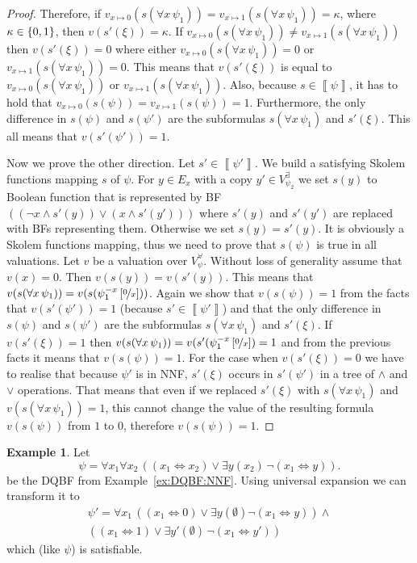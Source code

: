 \documentclass[
  digital, %
  color,
  twoside, %
  table,   %
  nolof,     %
  nolot,     %
]{fithesis3}
\let\setbuilder\set
\newcommand{\simpleset}[1]{\{{#1}\}}
\renewcommand{\set}[1]{\normalexpandarg\IfSubStr{#1}{|}{\setbuilder{#1}}{\simpleset{#1}}}
\theoremstyle{definition}
\newtheorem{example}{Example}
\theoremstyle{remark}
\newcommand{\seman}[1]{\left\llbracket {#1} \right\rrbracket}
\newcommand{\substitute}[2]{\left[ \nicefrac{#2}{#1} \right]}
\newcommand{\evars}[1]{V_{#1}^{\exists}}
\newcommand{\uvars}[1]{V_{#1}^{\forall}}
\newcommand{\lequal}{\Leftrightarrow}
\newcommand{\itholds}{\,}
\begin{document}
\begin{proof}
  Therefore, if $v_{x\mapsto0}(s(\forall x\itholds\psi_1)) = v_{x\mapsto1}(s(\forall x\itholds\psi_1)) = \kappa$, where $\kappa \in \set{0,1}$, then $v(s'(\xi)) = \kappa$. If $v_{x\mapsto0}(s(\forall x\itholds\psi_1)) \not= v_{x\mapsto1}(s(\forall x\itholds\psi_1))$ then $v(s'(\xi)) = 0$ where either $v_{x\mapsto0}(s(\forall x\itholds\psi_1)) = 0$ or $v_{x\mapsto1}(s(\forall x\itholds\psi_1)) = 0$. This means that $v(s'(\xi))$ is equal to $v_{x\mapsto0}(s(\forall x\itholds\psi_1))$ or $v_{x\mapsto1}(s(\forall x\itholds\psi_1))$. Also, because $s \in \seman{\psi}$, it has to hold that $v_{x\mapsto0}(s(\psi)) = v_{x\mapsto1}(s(\psi)) = 1$. Furthermore, the only difference in $s(\psi)$ and $s(\psi')$ are the subformulas $s(\forall x\itholds\psi_1)$ and $s'(\xi)$. This all means that $v(s'(\psi')) = 1$.

  Now we prove the other direction. Let $s' \in \seman{\psi'}$. We build a satisfying Skolem functions mapping $s$ of $\psi$. For $y \in E_x$ with a copy $y' \in \evars{\psi_2}$ we set $s(y)$ to Boolean function that is represented by BF $((\neg x \land s'(y)) \lor (x \land s'(y')))$ where $s'(y)$ and $s'(y')$ are replaced with BFs representing them. Otherwise we set $s(y) = s'(y)$. It is obviously a Skolem functions mapping, thus we need to prove that $s(\psi)$ is true in all valuations. Let $v$ be a valuation over $\uvars{\psi}$. Without loss of generality assume that $v(x) = 0$. Then $v(s(y)) = v(s'(y))$. This means that $v(s(\forall x \itholds \psi_1)) = v(s(\psi_1^{-x}\substitute{x}{0}))$. Again we show that $v(s(\psi)) = 1$ from the facts that $v(s'(\psi')) = 1$ (because $s' \in \seman{\psi'}$) and that the only difference in $s(\psi)$ and $s(\psi')$ are the subformulas $s(\forall x\itholds\psi_1)$ and $s'(\xi)$. If $v(s'(\xi)) = 1$ then $v(s(\forall x \itholds \psi_1)) = v(s'(\psi_1^{-x}\substitute{x}{0}) = 1$ and from the previous facts it means that $v(s(\psi)) = 1$. For the case when $v(s'(\xi)) = 0$ we have to realise that because $\psi'$ is in NNF, $s'(\xi)$ occurs in $s'(\psi')$ in a tree of ${\land}$ and ${\lor}$ operations. That means that even if we replaced $s'(\xi)$ with $s(\forall x \itholds \psi_1)$ and $v(s(\forall x \itholds \psi_1)) = 1$, this cannot change the value of the resulting formula $v(s(\psi))$ from $1$ to $0$, therefore $v(s(\psi)) = 1$.
\end{proof}
\begin{example}
Let
\[\psi = \forall x_1 \forall x_2\itholds ((x_1 \lequal x_2) \lor \exists y (x_2)\itholds \neg(x_1 \lequal y)).\]
be the DQBF from Example~\ref{ex:DQBF:NNF}. Using universal expansion we can transform it to
\begin{multline*}
    \psi' = \forall x_1 \itholds ((x_1 \lequal 0) \lor \exists y (\emptyset) \neg(x_1 \lequal y)) \land {}\\
    ((x_1 \lequal 1) \lor \exists y' (\emptyset)\itholds\neg(x_1 \lequal y'))
\end{multline*}
which (like $\psi$) is satisfiable.
\end{example}
\end{document}
